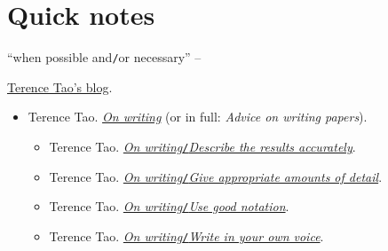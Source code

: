 \documentclass[oneside]{book}
\numberwithin{equation}{section}
\begin{document}

\appendix

\section*{Quick notes}
``when possible and\texttt{/}or necessary'' -- \cite[p. 47]{Rebollo_Lewandowski2014}



\begin{thebibliography}{99}
	 \href{https://terrytao.wordpress.com}{Terence Tao's blog}.
	\begin{itemize}
		\item Terence Tao. \href{https://terrytao.wordpress.com/advice-on-writing-papers/}{\textit{On writing}} (or in full: \textit{Advice on writing papers}).
		\begin{itemize}
			\item Terence Tao. \href{https://terrytao.wordpress.com/advice-on-writing-papers/describe-the-results-accurately/}{\textit{On writing}\texttt{/}\textit{Describe the results accurately}}.
			\item Terence Tao. \href{https://terrytao.wordpress.com/advice-on-writing-papers/give-appropriate-amounts-of-detail/}{\textit{On writing}\texttt{/}\textit{Give appropriate amounts of detail}}.
			\item Terence Tao. \href{https://terrytao.wordpress.com/advice-on-writing-papers/use-good-notation/}{\textit{On writing}\texttt{/}\textit{Use good notation}}.
			\item Terence Tao. \href{https://terrytao.wordpress.com/advice-on-writing-papers/write-in-your-own-voice/}{\textit{On writing}\texttt{/}\textit{Write in your own voice}}.
		\end{itemize}
	\end{itemize}
\end{thebibliography}


\printbibliography[heading=bibintoc]
	
\end{document}
